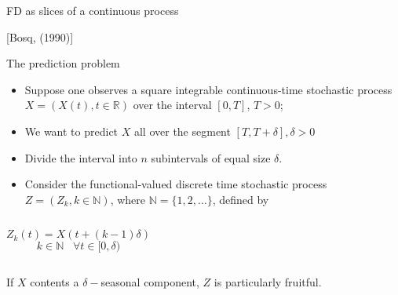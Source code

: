 \documentclass[xcolor=dvipsnames, smaller]{beamer}
\newcommand{\N}{\mathbb{N}}                          %
\newcommand{\set}[1]{\lbrace#1\rbrace}               %
\newcommand{\R}{\mathbb{R}}         %
\begin{document}
\begin{frame}[shrink]{FD as slices of a continuous process 
      \begin{scriptsize} \hfill [Bosq, (1990)] \end{scriptsize}} 
%  
  The prediction problem

\begin{itemize}
  \item Suppose one observes a square integrable continuous-time  stochastic process $X=(X(t), t\in\R)$ over the interval $[0,T]$, $T>0$;
  \item {We want to predict $X$ all over the segment $[T, T+\delta], \delta>0$}
  \item {Divide the interval into $n$ subintervals of equal
             size $\delta$.}
  \item Consider the functional-valued discrete time stochastic process $ Z = (Z_k, k\in\N) $, where $ \mathbb{N} = \set{ 1,2,\ldots } $, defined by 
\end{itemize}
 
\begin{columns}
  \column{5cm}    
    
  \column{5cm} 
     \[ Z_k(t) = X(t + (k-1)\delta)             \]
     \[  k\in\N \;\;\; \forall t \in [0,\delta) \]
\end{columns}

\vfill
  If $X$ contents a $\delta-$seasonal component, 
     $Z$ is particularly fruitful.

\end{frame}

\end{document}
